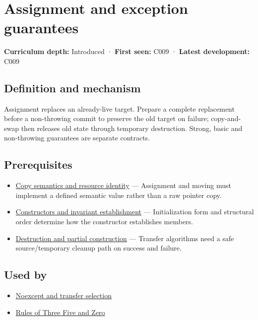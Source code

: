 \hypertarget{appendix-bea6beb5350f}{}\label{referencestart:appendix-bea6beb5350f}
\section{Assignment and exception guarantees}\label{appendix-bea6beb5350f-assignment-and-exception-guarantees}

\textbf{Curriculum depth:} Introduced · \textbf{First seen:} C009 · \textbf{Latest development:} C009

\subsection{Definition and mechanism}\label{appendix-bea6beb5350f-definition-and-mechanism}

Assignment replaces an already-live target. Prepare a complete replacement before a non-throwing commit to preserve the old target on failure; copy-and-swap then releases old state through temporary destruction. Strong, basic and non-throwing guarantees are separate contracts.

\subsection{Prerequisites}\label{appendix-bea6beb5350f-prerequisites}

\begin{itemize}
\tightlist
\item
  \hyperref[appendix-1340cd1ce582]{Copy semantics and resource identity} --- Assignment and moving must implement a defined semantic value rather than a raw pointer copy.
\item
  \hyperref[appendix-7f8ec83d0886]{Constructors and invariant establishment} --- Initialization form and structural order determine how the constructor establishes members.
\item
  \hyperref[appendix-9bfe377cef7a]{Destruction and partial construction} --- Transfer algorithms need a safe source/temporary cleanup path on success and failure.
\end{itemize}

\subsection{Used by}\label{appendix-bea6beb5350f-used-by}

\begin{itemize}
\tightlist
\item
  \hyperref[appendix-c746afaa47d1]{Noexcept and transfer selection}
\item
  \hyperref[appendix-7679107d057e]{Rules of Three Five and Zero}
\end{itemize}

